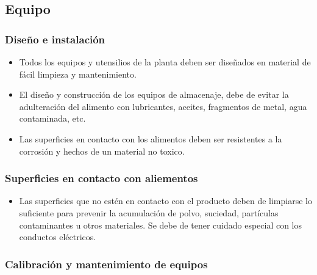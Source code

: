 \subsection{Equipo}

\subsubsection{Diseño e instalación}

\begin{itemize}
	\item Todos los equipos y utensilios de la planta deben ser diseñados en material de fácil limpieza y mantenimiento.
	\item El diseño y construcción de los equipos de almacenaje, debe de evitar la adulteración del alimento con lubricantes, aceites, fragmentos de metal, agua contaminada, etc.
	\item Las superficies en contacto con los alimentos deben ser resistentes a la corrosión y hechos de un material no toxico.
\end{itemize}

\subsubsection{Superficies en contacto con aliementos}

\begin{itemize}
	\item Las superficies que no estén en contacto con el producto deben de limpiarse lo suficiente para prevenir la acumulación de polvo, suciedad, partículas contaminantes u otros materiales. Se debe de tener cuidado especial con los conductos eléctricos.
\end{itemize}

\subsubsection{Calibración y mantenimiento de equipos}

